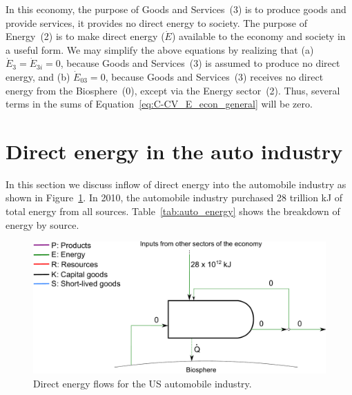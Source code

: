 In this economy, the purpose of Goods and Services~(3) 
is to produce goods and provide services, 
it provides no direct energy to society. 
The purpose of Energy~(2) is to make direct energy ($\dot{E}$) 
available to the economy and society in a useful form.
We may simplify the above equations
by realizing that (a)~$\dot{E}_{3} = \dot{E}_{3i} = 0$, 
because Goods and Services~(3)
is assumed to produce no direct energy, 
and (b) $\dot{E}_{03} = 0$, 
because Goods and Services~(3) 
receives no direct energy from the Biosphere~(0), 
except via the Energy sector~(2).
Thus, several terms in the sums of
Equation~\ref{eq:C-CV_E_econ_general}
will be zero.


\section{Direct energy in the auto industry}
\label{sec:energy_auto}

In this section we discuss inflow of direct energy into the automobile industry
as shown in Figure~\ref{fig:PERKS_energy_auto}.
In 2010, the automobile industry purchased 28 trillion kJ of total energy from all sources. 
Table~\ref{tab:auto_energy} shows the breakdown of energy by source. 

\begin{figure}[!ht]
\centering
\includegraphics[width=0.8\linewidth]{Part_1/Chapter_Energy/images/PERKS_basic_unit_energy_auto_ind.pdf}
\caption[Direct energy flows for the US automobile industry]
{Direct energy flows for the US automobile industry.\cite[Table 7.6]{EIA:2014aa}}
\label{fig:PERKS_energy_auto}
\end{figure}

